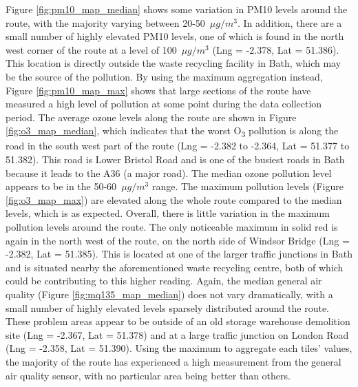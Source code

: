 \documentclass[11pt]{report}
\begin{document}
Figure \ref{fig:pm10_map_median} shows some variation in PM10 levels around the route, with the majority varying between 20-50~$\mu g/m^3$. In addition, there are a small number of highly elevated PM10 levels, one of which is found in the north west corner of the route at a level of 100~$\mu g/m^3$ (Lng = -2.378, Lat = 51.386). This location is directly outside the waste recycling facility in Bath, which may be the source of the pollution. By using the maximum aggregation instead, Figure \ref{fig:pm10_map_max} shows that large sections of the route have measured a high level of pollution at some point during the data collection period. The average ozone levels along the route are shown in Figure \ref{fig:o3_map_median}, which indicates that the worst O\textsubscript{3} pollution is along the road in the south west part of the route (Lng = -2.382 to -2.364, Lat = 51.377 to 51.382). This road is Lower Bristol Road and is one of the busiest roads in Bath because it leads to the A36 (a major road). The median ozone pollution level appears to be in the 50-60~$\mu g/m^3$ range. The maximum pollution levels (Figure \ref{fig:o3_map_max}) are elevated along the whole route compared to the median levels, which is as expected. Overall, there is little variation in the maximum pollution levels around the route. The only noticeable maximum in solid red is again in the north west of the route, on the north side of Windsor Bridge (Lng = -2.382, Lat = 51.385). This is located at one of the larger traffic junctions in Bath and is situated nearby the aforementioned waste recycling centre, both of which could be contributing to this higher reading. Again, the median general air quality (Figure \ref{fig:mq135_map_median}) does not vary dramatically, with a small number of highly elevated levels sparsely distributed around the route. These problem areas appear to be outside of an old storage warehouse demolition site (Lng = -2.367, Lat = 51.378) and at a large traffic junction on London Road (Lng = -2.358, Lat = 51.390). Using the maximum to aggregate each tiles' values, the majority of the route has experienced a high measurement from the general air quality sensor, with no particular area being better than others.
\end{document}
